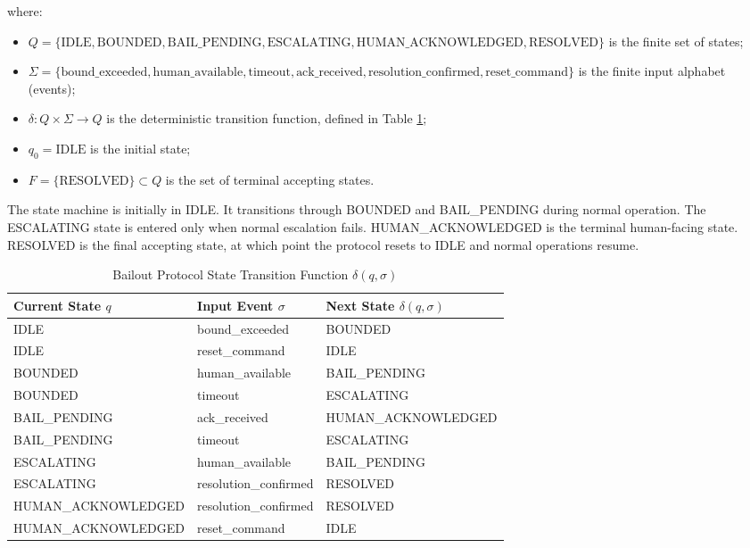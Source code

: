 where:

\begin{itemize}
    \item $Q = \{ \text{IDLE}, \text{BOUNDED}, \text{BAIL\_PENDING}, \text{ESCALATING}, \text{HUMAN\_ACKNOWLEDGED}, \text{RESOLVED} \}$ is the finite set of states;
    \item $\Sigma = \{ \text{bound\_exceeded}, \text{human\_available}, \text{timeout}, \text{ack\_received}, \text{resolution\_confirmed}, \text{reset\_command} \}$ is the finite input alphabet (events);
    \item $\delta: Q \times \Sigma \rightarrow Q$ is the deterministic transition function, defined in Table \ref{tab:state_transitions};
    \item $q_0 = \text{IDLE}$ is the initial state;
    \item $F = \{ \text{RESOLVED} \} \subset Q$ is the set of terminal accepting states.
\end{itemize}

The state machine is initially in IDLE. It transitions through BOUNDED and BAIL\_PENDING during normal operation. The ESCALATING state is entered only when normal escalation fails. HUMAN\_ACKNOWLEDGED is the terminal human-facing state. RESOLVED is the final accepting state, at which point the protocol resets to IDLE and normal operations resume.

\begin{table}[htbp]
\centering
\caption{Bailout Protocol State Transition Function $\delta(q, \sigma)$}
\label{tab:state_transitions}
\begin{tabular}{l|l|l}
\toprule
Current State $q$ & Input Event $\sigma$ & Next State $\delta(q, \sigma)$ \\ \midrule
IDLE & bound\_exceeded & BOUNDED \\
IDLE & reset\_command & IDLE \\
BOUNDED & human\_available & BAIL\_PENDING \\
BOUNDED & timeout & ESCALATING \\
BAIL\_PENDING & ack\_received & HUMAN\_ACKNOWLEDGED \\
BAIL\_PENDING & timeout & ESCALATING \\
ESCALATING & human\_available & BAIL\_PENDING \\
ESCALATING & resolution\_confirmed & RESOLVED \\
HUMAN\_ACKNOWLEDGED & resolution\_confirmed & RESOLVED \\
HUMAN\_ACKNOWLEDGED & reset\_command & IDLE \\ \bottomrule
\end{tabular}
\end{table}

